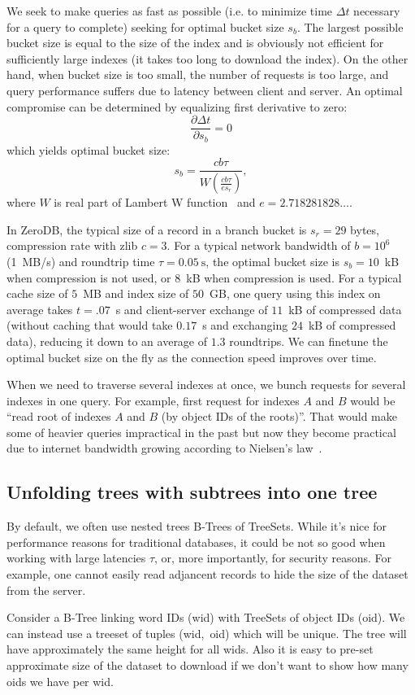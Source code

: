 \documentclass[notitlepage]{revtex4-1}
\begin{document}
We seek to make queries as fast as possible (i.e. to minimize time $\Delta t$ necessary for a query to complete) seeking for optimal bucket size $s_b$.
The largest possible bucket size is equal to the size of the index and is obviously not efficient for sufficiently large indexes (it takes too long to download the index).
On the other hand, when bucket size is too small, the number of requests is too large, and query performance suffers due to latency between client and server.
An optimal compromise can be determined by equalizing first derivative to zero:
$$\frac{\partial \Delta t}{\partial s_b} = 0$$
which yields optimal bucket size:
$$s_b = \frac{cb\tau}{W\left( \frac{cb\tau}{e s_r}\right)},$$
where $W$ is real part of Lambert W function~\cite{wiki:lambert}
and $e=2.718281828\ldots$.

In ZeroDB, the typical size of a record in a branch bucket is $s_r = 29$ bytes,
compression rate with zlib $c=3$.
For a typical network bandwidth of $b=10^6$ (1~MB/s) and roundtrip time $\tau=0.05~\mbox{s}$, the optimal bucket size is $s_b=10$~kB when compression is not used, or $8$~kB when compression is used.
For a typical cache size of $5$~MB and index size of $50$~GB,
one query using this index on average takes $t=.07$~s and client-server exchange of $11$~kB of compressed data (without caching that would take $0.17$~s and exchanging $24$~kB of compressed data), reducing it down to an average of $1.3$ roundtrips.
We can finetune the optimal bucket size on the fly as the connection speed improves over time.

When we need to traverse several indexes at once, we bunch requests for several indexes in one query.
For example, first request for indexes $A$ and $B$ would be ``read root of indexes $A$ and $B$ (by object IDs of the roots)''.
That would make some of heavier queries impractical in the past but now they become practical due to internet bandwidth growing according to Nielsen's law~\cite{nielsen-law}.

\subsection{Unfolding trees with subtrees into one tree}
\label{sec:unfold-trees}

By default, we often use nested trees B-Trees of TreeSets.
While it's nice for performance reasons for traditional databases, it could be not so good when working with large latencies $\tau$,
or, more importantly, for security reasons.
For example, one cannot easily read adjancent records to hide the size of the dataset from the server.

Consider a B-Tree linking word IDs (wid) with TreeSets of object IDs (oid).
We can instead use a treeset of tuples (wid,~oid) which will be unique.
The tree will have approximately the same height for all wids.
Also it is easy to pre-set approximate size of the dataset to download if we don't want to show how many oids we have per wid.


\end{document}
